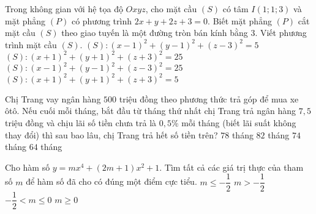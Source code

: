 \begin{ex}%
	Trong không gian với hệ tọa độ $Oxyz$, cho mặt cầu $(S)$ có tâm $I(1;1;3)$ và mặt phẳng $(P)$ có phương trình $2x+y+2z+3=0$. Biết mặt phẳng $(P)$ cắt mặt cầu $(S)$ theo giao tuyến là một đường tròn bán kính bằng $3$. Viết phương trình mặt cầu $(S)$. 
	\choice
	{$(S) \colon (x-1)^2+(y-1)^2+(z-3)^2=5$}
	{$(S) \colon (x+1)^2+(y+1)^2+(z+3)^2=25$}
	{\True $(S) \colon (x-1)^2+(y-1)^2+(z-3)^2=25$}
	{$(S) \colon (x+1)^2+(y+1)^2+(z+3)^2=5$}
\end{ex}
\begin{ex}%
	Chị Trang vay ngân hàng $500$ triệu đồng theo phương thức trả góp để mua xe ôtô. Nếu cuối mỗi tháng, bắt đầu từ tháng thứ nhất chị Trang trả ngân hàng $7{,}5$ triệu đồng và chịu lãi số tiền chưa trả là $0{,}5$\% mỗi tháng (biết lãi suất không thay đổi) thì sau bao lâu, chị Trang trả hết số tiền trên?
	\choice
	{$78$ tháng}
	{\True $82$ tháng}
	{$74$ tháng}
	{$64$ tháng}
\end{ex}
\begin{ex}%
	Cho hàm số $y=mx^4+(2m+1)x^2+1$. Tìm tất cả các giá trị thực của tham số $m$ để hàm số đã cho có đúng một điểm cực tiểu. 
	\choice
	{$m\le-\dfrac{1}{2}$}
	{\True $m>-\dfrac{1}{2}$}
	{$-\dfrac{1}{2}<m\le0$}
	{$m\ge0$}
\end{ex}
